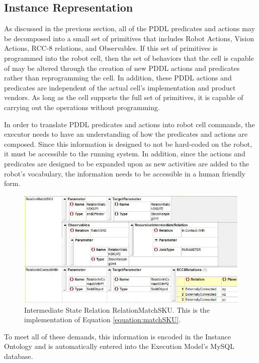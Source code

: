 \subsection{Instance Representation}
\label{sect:instance}
As discussed in the previous section, all of the PDDL predicates and actions may be
decomposed into a small set of primitives that includes
Robot Actions, Vision Actions, RCC-8 relations, and Observables. 
If this set of primitives is
programmed into the robot cell, then the set of behaviors that the cell is capable of
may be altered through the creation of new PDDL actions and predicates rather than
reprogramming the cell. In addition, these PDDL actions and predicates are independent
of the actual cell's implementation and product vendors. As long as the cell supports the
full set of primitives, it is capable of carrying out the operations without programming.

In order to translate PDDL predicates and actions into robot cell commands, 
the executor needs to have an
understanding of how the predicates and actions are composed. Since this information is
designed to not be hard-coded on the robot, it must be accessible to the running system.
In addition, since the actions and predicates are designed to be expanded upon as
new activities are added to the robot's vocabulary, the information needs to be
accessible in a human friendly form.
%
\begin{figure}[htb!]
\begin{center}
\includegraphics[width=12cm]{images/MatchSKU_ISR.jpg}
\caption{Intermediate State Relation RelationMatchSKU. This is the
implementation of Equation \ref{equation:matchSKU}.}
\label{fig:ISR}
\end{center}
\end{figure}
%
To meet all of these demands, this information is encoded in the Instance Ontology and is automatically entered into the Execution Model's MySQL database. 

